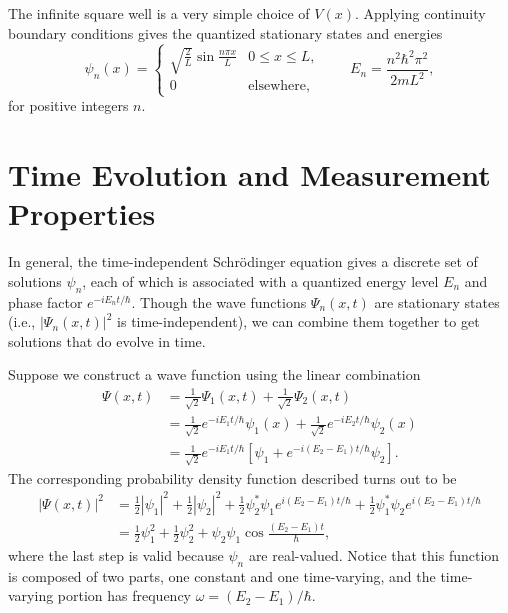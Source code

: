 \documentclass[../p052main.tex]{subfiles}
\begin{document}
\begin{summary}
    The infinite square well is a very simple choice of $V(x)$.
    Applying continuity boundary conditions gives the quantized stationary states and energies
    \[ \psi_n(x) = \begin{cases} \sqrt{\frac{2}{L}} \sin \frac{n \pi x}{L} & 0 \leq x \leq L, \\ 0 & \text{elsewhere}, \end{cases} \qquad E_n = \frac{n^2 \hbar^2 \pi^2}{2mL^2}, \]
    for positive integers $n$.
\end{summary}

\section{Time Evolution and Measurement Properties}
In general, the time-independent Schrödinger equation gives a discrete set of solutions $\psi_n$, each of which is associated with a quantized energy level $E_n$ and phase factor $e^{-i E_n t / \hbar}$.
Though the wave functions $\Psi_n(x,t)$ are stationary states (i.e., $|\Psi_n(x,t)|^2$ is time-independent), we can combine them together to get solutions that do evolve in time.

\begin{example}[]
    Suppose we construct a wave function using the linear combination
    \begin{align*}
        \Psi(x,t) &= \frac{1}{\sqrt{2}} \Psi_1(x,t) + \frac{1}{\sqrt{2}} \Psi_2(x,t) \\
        &= \frac{1}{\sqrt{2}} e^{-i E_1 t / \hbar} \psi_1(x) + \frac{1}{\sqrt{2}} e^{-i E_2 t / \hbar} \psi_2(x) \\
        &= \frac{1}{\sqrt{2}} e^{-i E_1 t /\hbar} \left[ \psi_1 + e^{-i (E_2 - E_1) t / \hbar} \psi_2 \right].
    \end{align*}
    The corresponding probability density function described turns out to be
    \begin{align*}
        |\Psi(x,t)|^2 &= \frac{1}{2} |\psi_1|^2 + \frac{1}{2}|\psi_2|^2 + \frac{1}{2} \psi_2^* \psi_1 e^{i (E_2 - E_1) t /\hbar} + \frac{1}{2} \psi_1^* \psi_2 e^{i (E_2 - E_1) t /\hbar} \\
        &= \frac{1}{2} \psi_1^2 + \frac{1}{2} \psi_2^2 + \psi_2 \psi_1 \cos \frac{(E_2 - E_1) t}{\hbar},
    \end{align*}
    where the last step is valid because $\psi_n$ are real-valued.
    Notice that this function is composed of two parts, one constant and one time-varying, and the time-varying portion has frequency $\omega = (E_2 - E_1) / \hbar$.
\end{example}
\end{document}
